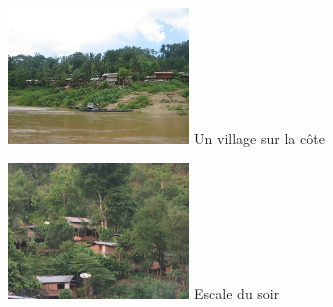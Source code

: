\begin{multicols}{2}
\hspace*{-0.65cm}
\includegraphics[width=4.8cm]{articles/Mekong/1214473400ezNu.jpg}
Un village sur la côte

\hspace*{-0.65cm}
\includegraphics[width=4.8cm]{articles/Mekong/1214473407uNUm.jpg}
Escale du soir

\end{multicols}
